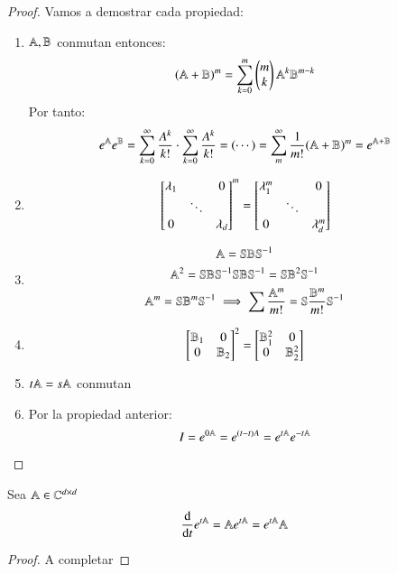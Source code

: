 \begin{proof}
    Vamos a demostrar cada propiedad:\\
    \begin{enumerate}
        \item $\mathbb{A}, \mathbb{B}$ conmutan entonces:
        $$
            (\mathbb{A} + \mathbb{B})^m = \sum_{k=0}^m
            \left(\begin{matrix}
                m\\
                k
            \end{matrix} \right)
            \mathbb{A}^k \mathbb{B}^{m-k}
        $$
        Por tanto:
        $$
            e^{\mathbb{A}} e^{\mathbb{B}} = \sum_{k=0}^{\infty}\frac{A^k}{k!} \cdot  \sum_{k=0}^{\infty}\frac{A^k}{k!} = (\cdots) = \sum_m^{\infty} \frac{1}{m!}(\mathbb{A}+\mathbb{B})^m = e^{\mathbb{A}+\mathbb{B}}
        $$
        \item
        $$
            \mx{\lambda_1& &0\\
                &\ddots&\\
                0& &\lambda_d}^m =
                \mx{\lambda_1^m&&0\\
                    &\ddots&\\
                    0&&\lambda_d^m}
        $$
        \item
        \begin{gather*}
                \mathbb{A} = \mathbb{S} \mathbb{B} \mathbb{S}^{-1}\\
                \mathbb{A}^2 = \mathbb{S} \mathbb{B} \mathbb{S}^{-1}\mathbb{S} \mathbb{B} \mathbb{S}^{-1} = \mathbb{S} \mathbb{B}^2 \mathbb{S}^{-1}\\
                \mathbb{A}^m = \mathbb{S} \mathbb{B}^m \mathbb{S}^{-1} \implies \sum \frac{\mathbb{A}^m}{m!} = \mathbb{S} \frac{\mathbb{B}^m}{m!} \mathbb{S}^{-1}
        \end{gather*}
        \item
        $$
            \mx{\B_1 & 0 \\
                0 & \B_2} ^2 = \mx{\B_1^2 & 0 \\
                    0 & \B_2^2}
        $$
        \item $t\mathbb{A} = s \mathbb{A}$ conmutan
        \item Por la propiedad anterior:
        $$
            I = e^{0 \mathbb{A}} = e^{(t-t)A} = e^{t\mathbb{A}}e^{-t\mathbb{A}}
        $$
    \end{enumerate}
\end{proof}

\begin{pro}
    Sea $\mathbb{A} \in \mathbb{C}^{d\times d}$\\
    $$
        \frac{\mathrm{d}}{\mathrm{d}t} e^{t\mathbb{A}} = \mathbb{A} e^{t\mathbb{A}} = e^{t\mathbb{A}} \mathbb{A}
    $$
\end{pro}
\begin{proof}
    A completar
\end{proof}
